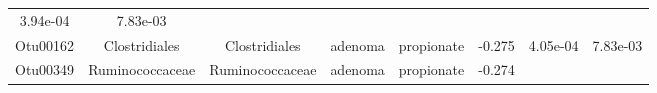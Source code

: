 \documentclass[11pt,]{article}
\begin{document}
\begin{longtable}[]{@{}cccccccc@{}}
\begin{minipage}[t]{0.08\columnwidth}
3.94e-04\strut
\end{minipage} & \begin{minipage}[t]{0.08\columnwidth}\centering\strut
7.83e-03\strut
\end{minipage}\tabularnewline
\begin{minipage}[t]{0.08\columnwidth}\centering\strut
Otu00162\strut
\end{minipage} & \begin{minipage}[t]{0.15\columnwidth}\centering\strut
Clostridiales\strut
\end{minipage} & \begin{minipage}[t]{0.15\columnwidth}\centering\strut
Clostridiales\strut
\end{minipage} & \begin{minipage}[t]{0.08\columnwidth}\centering\strut
adenoma\strut
\end{minipage} & \begin{minipage}[t]{0.09\columnwidth}\centering\strut
propionate\strut
\end{minipage} & \begin{minipage}[t]{0.07\columnwidth}\centering\strut
-0.275\strut
\end{minipage} & \begin{minipage}[t]{0.08\columnwidth}\centering\strut
4.05e-04\strut
\end{minipage} & \begin{minipage}[t]{0.08\columnwidth}\centering\strut
7.83e-03\strut
\end{minipage}\tabularnewline
\begin{minipage}[t]{0.08\columnwidth}\centering\strut
Otu00349\strut
\end{minipage} & \begin{minipage}[t]{0.15\columnwidth}\centering\strut
Ruminococcaceae\strut
\end{minipage} & \begin{minipage}[t]{0.15\columnwidth}\centering\strut
Ruminococcaceae\strut
\end{minipage} & \begin{minipage}[t]{0.08\columnwidth}\centering\strut
adenoma\strut
\end{minipage} & \begin{minipage}[t]{0.09\columnwidth}\centering\strut
propionate\strut
\end{minipage} & \begin{minipage}[t]{0.07\columnwidth}\centering\strut
-0.274\strut
\end{minipage} & \begin{minipage}[t]{0.08\columnwidth}\centering\strut

\end{minipage}
\end{longtable}
\end{document}
